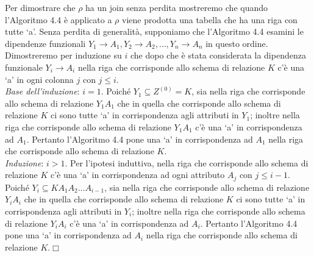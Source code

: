 Per dimostrare che $\rho$ ha un join senza perdita mostreremo che quando l'Algoritmo 4.4 è applicato a $\rho$
viene prodotta una tabella che ha una riga con tutte `a'. Senza perdita di generalità, supponiamo che l'Algoritmo 4.4
esamini le dipendenze funzionali $Y_1 \rightarrow A_1, Y_2 \rightarrow A_2, \ldots, Y_n \rightarrow A_n$ in questo ordine.
Dimostreremo per induzione su $i$ che dopo che è stata considerata la dipendenza funzionale $Y_i \rightarrow A_i$ nella 
riga che corrisponde allo schema di relazione $K$ c'è una `a' in ogni colonna $j$ con $j \leq i$.\\
\emph{Base dell'induzione}: $i=1$. Poiché $Y_1 \subseteq Z^{(0)} = K$, sia nella riga che corrisponde allo schema di
relazione $Y_1A_1$ che in quella che corrisponde allo schema di relazione $K$ ci sono tutte `a' in corrispondenza
agli attributi in $Y_1$; inoltre nella riga che corrisponde allo schema di relazione $Y_1A_1$ c'è una `a' in
corrispondenza ad $A_1$. Pertanto l'Algoritmo 4.4 pone una `a' in corrispondenza ad $A_1$ nella riga che corrisponde 
allo schema di relazione $K$.\\ 
\emph{Induzione}: $i > 1$. Per l'ipotesi induttiva, nella riga che corrisponde allo schema di relazione $K$ c'è una
`a' in corrispondenza ad ogni attributo $A_j$ con $j \leq i-1$. Poiché $Y_i \subseteq KA_1A_2\ldots A_{i-1}$, sia nella
riga che corrisponde allo schema di relazione $Y_iA_i$ che in quella che corrisponde allo schema di relazione $K$ ci sono
tutte `a' in corrispondenza agli attributi in $Y_i$; inoltre nella riga che corrisponde allo schema di relazione $Y_iA_i$
c'è una `a' in corrispondenza ad $A_i$. Pertanto l'Algoritmo 4.4 pone una `a' in corrispondenza ad $A_i$ nella riga che 
corrisponde allo schema di relazione $K$.\hfill $\Box$

